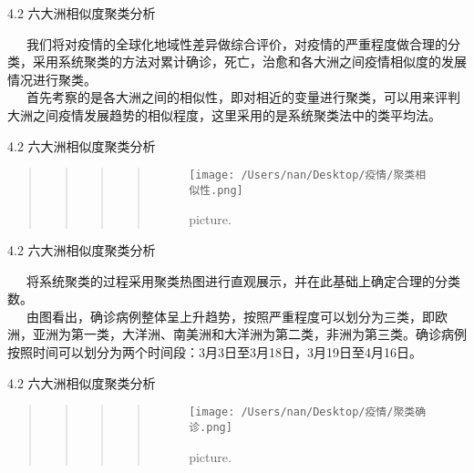 \documentclass[
  ignorenonframetext,
]{beamer}
\begin{document}
\begin{frame}{4.2 六大洲相似度聚类分析}
\protect\hypertarget{section-28}{}

  我们将对疫情的全球化地域性差异做综合评价，对疫情的严重程度做合理的分类，采用系统聚类的方法对累计确诊，死亡，治愈和各大洲之间疫情相似度的发展情况进行聚类。\\
  首先考察的是各大洲之间的相似性，即对相近的变量进行聚类，可以用来评判大洲之间疫情发展趋势的相似程度，这里采用的是系统聚类法中的类平均法。

\end{frame}

\begin{frame}{4.2 六大洲相似度聚类分析}
\protect\hypertarget{section-29}{}

\begin{quote}
\begin{quote}
\begin{quote}
\begin{quote}
\begin{figure}
\centering
\texttt{[image: /Users/nan/Desktop/疫情/聚类相似性.png]}
\caption{picture.}
\end{figure}
\end{quote}
\end{quote}
\end{quote}
\end{quote}

\end{frame}

\begin{frame}{4.2 六大洲相似度聚类分析}
\protect\hypertarget{section-30}{}

  将系统聚类的过程采用聚类热图进行直观展示，并在此基础上确定合理的分类数。\\
  由图看出，确诊病例整体呈上升趋势，按照严重程度可以划分为三类，即欧洲，亚洲为第一类，大洋洲、南美洲和大洋洲为第二类，非洲为第三类。确诊病例按照时间可以划分为两个时间段：3月3日至3月18日，3月19日至4月16日。

\end{frame}

\begin{frame}{4.2 六大洲相似度聚类分析}
\protect\hypertarget{section-31}{}

\begin{quote}
\begin{quote}
\begin{quote}
\begin{quote}
\begin{figure}
\centering
\texttt{[image: /Users/nan/Desktop/疫情/聚类确诊.png]}
\caption{picture.}
\end{figure}
\end{quote}
\end{quote}
\end{quote}
\end{quote}

\end{frame}
\end{document}
